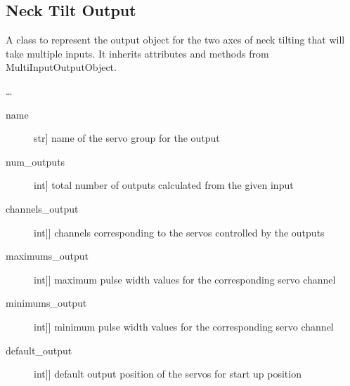 \documentclass[letterpaper,10pt,english]{sphinxmanual}
\begin{document}
\subsection{Neck Tilt Output}
\label{\detokenize{specific:module-NeckTiltOutput}}\label{\detokenize{specific:neck-tilt-output}}

\begin{fulllineitems}
\label{\detokenize{specific:NeckTiltOutput.NeckTiltOutput}}
\sphinxAtStartPar
A class to represent the output object for the two axes of neck tilting that will take multiple inputs.
It inherits attributes and methods from MultiInputOutputObject.

\sphinxAtStartPar
…

\sphinxAtStartPar
{}
\begin{description}
\item[{name}] \leavevmode{[}str{]}
\sphinxAtStartPar
name of the servo group for the output

\item[{num\_outputs}] \leavevmode{[}int{]}
\sphinxAtStartPar
total number of outputs calculated from the given input

\item[{channels\_output}] \leavevmode{[}{[}int{]}{]}
\sphinxAtStartPar
channels corresponding to the servos controlled by the outputs

\item[{maximums\_output}] \leavevmode{[}{[}int{]}{]}
\sphinxAtStartPar
maximum pulse width values for the corresponding servo channel

\item[{minimums\_output}] \leavevmode{[}{[}int{]}{]}
\sphinxAtStartPar
minimum pulse width values for the corresponding servo channel

\item[{default\_output}] \leavevmode{[}{[}int{]}{]}
\sphinxAtStartPar
default output position of the servos for start up position


\end{description}
\end{fulllineitems}
\end{document}
